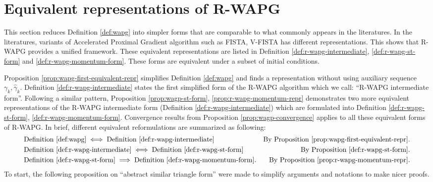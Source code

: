 \documentclass[12pt]{article}
\begin{document}
\section{Equivalent representations of R-WAPG}\label{sec:rwapg-equiv-repr}
    This section reduces Definition \ref{def:wapg} into simpler forms that are comparable to what commonly appears in the literatures. 
    In the literatures, variants of Accelerated Proximal Gradient algorithm such as FISTA, V-FISTA has different representations. 
    This shows that R-WAPG provides a unified framework. 
    These equivalent representations are listed in Definition \ref{def:r-wapg-intermediate}, \ref{def:r-wapg-st-form} and \ref{def:r-wapg-momentum-form}. 
    These forms are equivalent under a subset of initial conditions. 
    \par 
    Proposition \ref{prop:wapg-first-equivalent-repr} simplifies Definition \ref{def:wapg} and finds a representation without using auxiliary sequence $\gamma_k, \hat \gamma_k$. 
    Definition \ref{def:r-wapg-intermediate} states the first simplified form of the R-WAPG algorithm which we call: ``R-WAPG intermediate form''. 
    Following a similar pattern, Proposition \ref{prop:wagp-st-form}, \ref{prop:r-wapg-momentum-repr} demonstrates two more equivalent representations of the R-WAPG intermediate form (Definition \ref{def:r-wapg-intermediate}) which are formulated into Definition \ref{def:r-wapg-st-form}, \ref{def:r-wapg-momentum-form}. 
    Convergence results from Proposition \ref{prop:wagp-convergence} applies to all these equivalent forms of R-WAPG. 
    In brief, different equivalent reformulations are summarized as following: 
    \begin{align*}
        &\text{Definition \ref{def:wapg}}   \iff 
        \text{Definition \ref{def:r-wapg-intermediate}}  & \text{By Proposition \ref{prop:wapg-first-equivalent-repr}.}
        \\
        & \text{Definition \ref{def:r-wapg-intermediate}}
        \iff \text{Definition \ref{def:r-wapg-st-form}} & \text{By Proposition \ref{def:r-wapg-st-form}.}
        \\
        & 
        \text{Definition \ref{def:r-wapg-st-form}}\implies 
        \text{Definition }\ref{def:r-wapg-momentum-form}. 
        & \text{By Proposition }\ref{prop:r-wapg-momentum-repr}.
    \end{align*}
    To start, the following proposition on ``abstract similar triangle form'' were made to simplify arguments and notations to make nicer proofs. 
\end{document}
